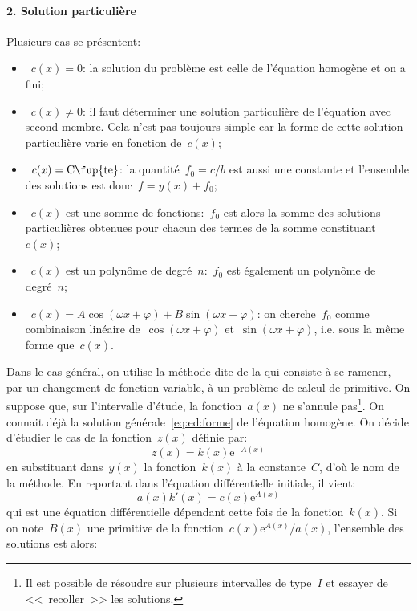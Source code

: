 \paragraph{2. Solution particulière}
Plusieurs cas se présentent:
\begin{itemize}
\item~$c(x)=0$: la solution du problème est celle de l'équation homogène et on a fini;
\item~$c(x)\ne0$: il faut déterminer une solution particulière de l'équation avec second membre. Cela n'est pas toujours simple car la forme de cette solution particulière varie en fonction de~$c(x)$;
\item~$c(x)=\text{C\fup{te}}$: la quantité~$f_0=c/b$ est aussi une constante et l'ensemble des solutions est donc~$f=y(x)+f_0$;
\item~$c(x)$ est une somme de fonctions:~$f_0$ est alors la somme des solutions particulières obtenues pour chacun des termes de la somme constituant~$c(x)$;
\item~$c(x)$ est un polynôme de degré~$n$:~$f_0$ est également un polynôme de degré~$n$;
\item~$c(x) = A\cos(\omega x + \varphi) + B \sin(\omega x + \varphi)$: on cherche~$f_0$ comme combinaison linéaire de~$\cos(\omega x + \varphi)$ et~$\sin(\omega x + \varphi)$, i.e. sous la même forme que~$c(x)$. 
\end{itemize}
Dans le cas général, on utilise la méthode dite de la  qui consiste à se ramener, par un changement de fonction variable, à un problème de calcul de primitive. On suppose que, sur l'intervalle d'étude, la fonction~$a(x)$ ne s'annule pas\footnote{Il est possible de résoudre sur plusieurs intervalles de type~$I$ et essayer de <<~recoller~>> les solutions.}. On connait déjà la solution générale~\eqref{eq:ed:forme} de l'équation homogène. On décide d'étudier le cas de la fonction~$z(x)$ définie par:
\begin{equation}
z(x) = k(x)\mathrm{e}^{- A(x)}
\end{equation}
en substituant dans~$y(x)$ la fonction~$k(x)$ à la constante~$C$, d'où le nom de la méthode. En reportant dans l'équation différentielle initiale, il vient:
\begin{equation}
a(x)k'(x) = c(x)\mathrm{e}^{A(x)}
\end{equation}
qui est une équation différentielle dépendant cette fois de la fonction~$k(x)$. Si on note~$B(x)$ une primitive de la fonction~$c(x) \mathrm{e}^{A(x)}/a(x)$, l'ensemble des solutions est alors:
